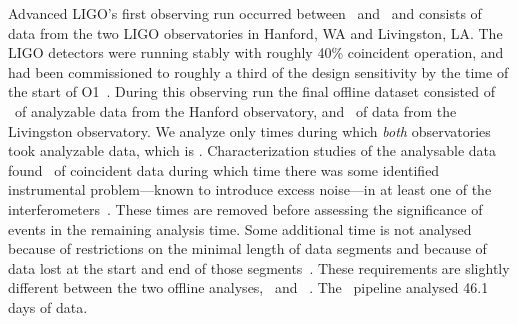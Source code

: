 Advanced \ac{LIGO}'s first observing run occurred between \OoneSTART\ and \OoneEND\
and consists of data from the two \ac{LIGO} observatories in Hanford, WA and Livingston, LA.
The LIGO detectors were running stably with roughly 40\% coincident operation, and had
been commissioned to roughly a third of the design sensitivity by the time of the start of O1~\citep{Martynov:2016fzi}.
During this observing run the final offline dataset consisted of \OoneOfflineAnalysableHTimeSeconds\
of analyzable data from the Hanford observatory, and \OoneOfflineAnalysableLTimeSeconds\ of data from the
Livingston observatory. We analyze only times during which \emph{both} observatories
took analyzable data, which is \OoneOfflineAnalysableTimeSeconds. Characterization studies of the analysable
data found \OoneOfflineAnalysableCatTwoDiffSeconds\ of coincident data during which time
there was some identified instrumental problem---known to
introduce excess noise---in at least one of the interferometers~\citep{TheLIGOScientific:2016zmo}.
These times are removed before assessing the significance of events
in the remaining analysis time. Some additional time is not analysed because
of restrictions on the minimal length of data segments and because of data lost
at the start and end of those segments~\citep{TheLIGOScientific:2016qqj, TheLIGOScientific:2016pea}.
These requirements are slightly different between the two offline analyses, \pycbc\ and \gstlal\ . The \pycbc\
pipeline analysed 46.1 days of data.
